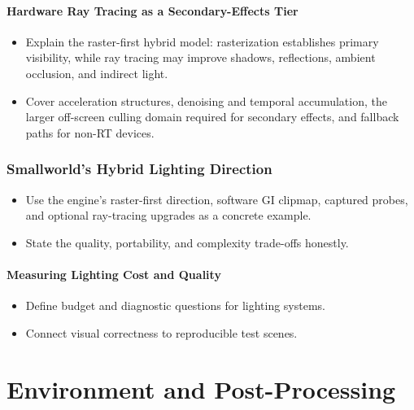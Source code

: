 \documentclass[
  11pt,
  letterpaper,
  DIV=11,
  numbers=noendperiod,
  twoside,
  open=right]{scrreprt}
\providecommand{\tightlist}{%
  \setlength{\itemsep}{0pt}\setlength{\parskip}{0pt}}
\begin{document}
\subsubsection{Hardware Ray Tracing as a Secondary-Effects
Tier}\label{hardware-ray-tracing-as-a-secondary-effects-tier}

\begin{itemize}
\tightlist
\item
  Explain the raster-first hybrid model: rasterization establishes
  primary visibility, while ray tracing may improve shadows,
  reflections, ambient occlusion, and indirect light.
\item
  Cover acceleration structures, denoising and temporal accumulation,
  the larger off-screen culling domain required for secondary effects,
  and fallback paths for non-RT devices.
\end{itemize}

\subsection{Smallworld's Hybrid Lighting
Direction}\label{smallworlds-hybrid-lighting-direction}

\begin{itemize}
\tightlist
\item
  Use the engine's raster-first direction, software GI clipmap, captured
  probes, and optional ray-tracing upgrades as a concrete example.
\item
  State the quality, portability, and complexity trade-offs honestly.
\end{itemize}

\subsubsection{Measuring Lighting Cost and
Quality}\label{measuring-lighting-cost-and-quality}

\begin{itemize}
\tightlist
\item
  Define budget and diagnostic questions for lighting systems.
\item
  Connect visual correctness to reproducible test scenes.
\end{itemize}

\chapter{Environment and
Post-Processing}\label{environment-and-post-processing}
\end{document}

